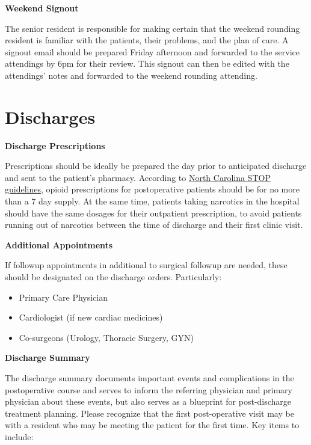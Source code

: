 \documentclass[
]{book}
\providecommand{\tightlist}{%
  \setlength{\itemsep}{0pt}\setlength{\parskip}{0pt}}
\begin{document}
\textbf{Weekend Signout}

The senior resident is responsible for making certain that the weekend rounding resident is familiar with the patients, their problems, and the plan of care. A signout email should be prepared Friday afternoon and forwarded to the service attendings by 6pm for their review. This signout can then be edited with the attendings' notes and forwarded to the weekend rounding attending.

\hypertarget{discharges}{%
\chapter{Discharges}\label{discharges}}

\textbf{Discharge Prescriptions}

Prescriptions should be ideally be prepared the day prior to anticipated discharge and sent to the patient's pharmacy. According to \href{https://www.ncmedboard.org/images/uploads/license_applications/STOPAct-focusedFAQs-Sept2019.pdf}{North Carolina STOP guidelines}, opioid prescriptions for postoperative patients should be for no more than a 7 day supply. At the same time, patients taking narcotics in the hospital should have the same dosages for their outpatient prescription, to avoid patients running out of narcotics between the time of discharge and their first clinic visit.

\textbf{Additional Appointments}

If followup appointments in additional to surgical followup are needed, these should be designated on the discharge orders. Particularly:

\begin{itemize}
\tightlist
\item
  Primary Care Physician
\item
  Cardiologist (if new cardiac medicines)
\item
  Co-surgeons (Urology, Thoracic Surgery, GYN)
\end{itemize}

\textbf{Discharge Summary}

The discharge summary documents important events and complications in the postoperative course and serves to inform the referring physician and primary physician about these events, but also serves as a blueprint for post-discharge treatment planning. Please recognize that the first post-operative visit may be with a resident who may be meeting the patient for the first time. Key items to include:
\end{document}
